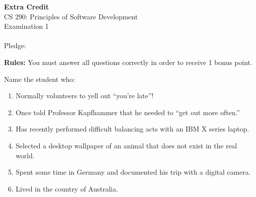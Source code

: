 \documentclass[12pt]{article}
\begin{document}

\begin{center}

{\bf Extra Credit} \\ 
CS 290: Principles of Software Development \\
Examination 1 \\ \mbox{} \\
Pledge: \\

\vspace*{.4in}

{\bf Rules:} You must answer all questions correctly in order to
receive 1 bonus point.

\end{center}

\noindent
Name the student who:

\begin{enumerate}

\item Normally volunteers to yell out ``you're late''!

\item Once told Professor Kapfhammer that he needed to ``get out more
  often.''

\item Has recently performed difficult balancing acts with an IBM
  X series laptop.

\item Selected a desktop wallpaper of an animal that does not exist in
  the real world.

\item Spent some time in Germany and documented his trip with a
  digital camera.

\item Lived in the country of Australia.

\end{enumerate}
\end{document}

